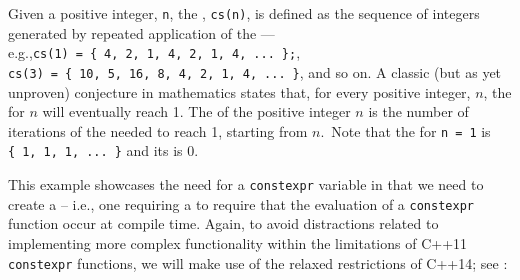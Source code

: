     
\noindent Given a positive integer, \lstinline!n!, the ,
\lstinline!cs(n)!, is defined as the sequence of integers generated by
repeated application of the  --- e.g.,\linebreak[4]%
 \lstinline!cs(1)!~\lstinline!=!~\lstinline!{!~\lstinline!4,!~\lstinline!2,!~\lstinline!1,!~\lstinline!4,!~\lstinline!2,!~\lstinline!1,!~\lstinline!4,!~\lstinline!...!~\lstinline!};!,
\lstinline!cs(3)!~\lstinline!=!~\lstinline!{!~\lstinline!10,!~\lstinline!5,!~\lstinline!16,!~\lstinline!8,!~\lstinline!4,!~\lstinline!2,!~\lstinline!1,!~\lstinline!4,!~\lstinline!...!~\lstinline!}!,
and so on. A classic (but as yet unproven) conjecture in mathematics
states that, for every positive integer, $n$, the  for $n$ will eventually reach 1. The  of
the positive integer $n$ is the number of iterations of the
 needed to reach 1, starting from $n$.~Note that
the  for \lstinline!n!~\lstinline!=!~\lstinline!1! is
\lstinline!{!~\lstinline!1,!~\lstinline!1,!~\lstinline!1,!~\lstinline!...!~\lstinline!}!
and its  is 0.

This example showcases the need for a \lstinline!constexpr! variable in
that we need to create a  -- i.e., one
requiring a  to require that the
evaluation of a \lstinline!constexpr! function occur at compile time.
Again, to avoid distractions related to implementing more complex
functionality within the limitations of C++11 \lstinline!constexpr!
functions, we will make use of the relaxed restrictions of C++14; see
:

